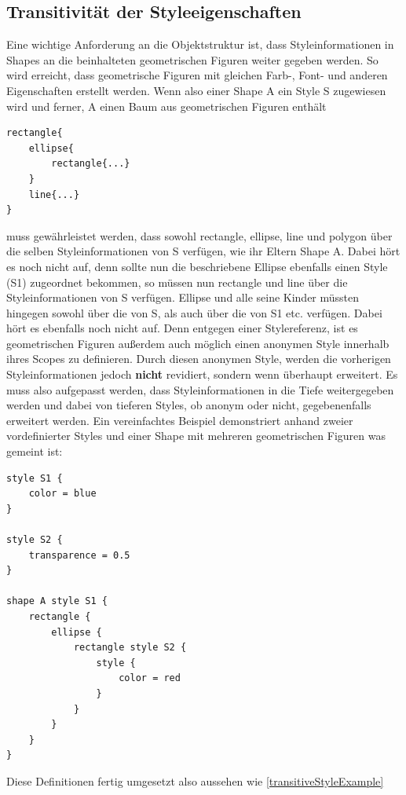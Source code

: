 \subsection{Transitivität der Styleeigenschaften}\label{transitivestyle}
Eine wichtige Anforderung an die Objektstruktur ist, dass Styleinformationen in Shapes an die beinhalteten geometrischen Figuren weiter gegeben werden. So wird erreicht, dass geometrische Figuren mit gleichen Farb-, Font- und anderen Eigenschaften erstellt werden. Wenn also einer Shape A ein Style S zugewiesen wird und ferner, A einen Baum aus geometrischen Figuren enthält
\begin{lstlisting}[style=scala]
rectangle{
    ellipse{
        rectangle{...}
    }
    line{...}
}
\end{lstlisting}muss gewährleistet werden, dass sowohl rectangle, ellipse, line und polygon über die selben Styleinformationen von S verfügen, wie ihr Eltern Shape A.
Dabei hört es noch nicht auf, denn sollte nun die beschriebene Ellipse ebenfalls einen Style (S1) zugeordnet bekommen, so müssen nun rectangle und line über die Styleinformationen von S verfügen. Ellipse und alle seine Kinder müssten hingegen sowohl über die von S, als auch über die von S1 etc. verfügen.
Dabei hört es ebenfalls noch nicht auf. Denn entgegen einer Stylereferenz, ist es geometrischen Figuren außerdem auch möglich einen anonymen Style innerhalb ihres Scopes zu definieren. Durch diesen anonymen Style, werden die vorherigen Styleinformationen jedoch \textbf{nicht} revidiert, sondern wenn überhaupt erweitert. Es muss also aufgepasst werden, dass Styleinformationen in die Tiefe weitergegeben werden und dabei von tieferen Styles, ob anonym oder nicht, gegebenenfalls erweitert werden.
Ein vereinfachtes Beispiel demonstriert anhand zweier vordefinierter Styles und einer Shape mit mehreren geometrischen Figuren was gemeint ist:
\begin{lstlisting}[style=scala]
style S1 {
    color = blue
}

style S2 {
	transparence = 0.5
}

shape A style S1 {
    rectangle {
        ellipse {
            rectangle style S2 {	
            	style {
            	    color = red
            	}
            }
        }
    }
}
\end{lstlisting}Diese Definitionen fertig umgesetzt also aussehen wie \ref{transitiveStyleExample}
